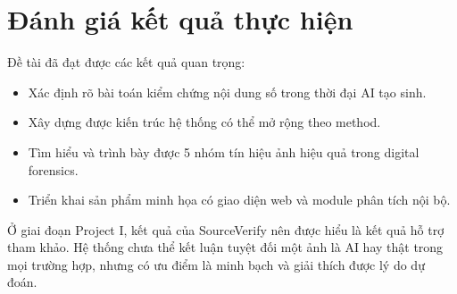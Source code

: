 \section{Đánh giá kết quả thực hiện}
Đề tài đã đạt được các kết quả quan trọng:
\begin{itemize}
  \item Xác định rõ bài toán kiểm chứng nội dung số trong thời đại AI tạo sinh.
  \item Xây dựng được kiến trúc hệ thống có thể mở rộng theo method.
  \item Tìm hiểu và trình bày được 5 nhóm tín hiệu ảnh hiệu quả trong digital forensics.
  \item Triển khai sản phẩm minh họa có giao diện web và module phân tích nội bộ.
\end{itemize}

Ở giai đoạn Project I, kết quả của SourceVerify nên được hiểu là kết quả hỗ trợ tham khảo. Hệ thống chưa thể kết luận tuyệt đối một ảnh là AI hay thật trong mọi trường hợp, nhưng có ưu điểm là minh bạch và giải thích được lý do dự đoán.
